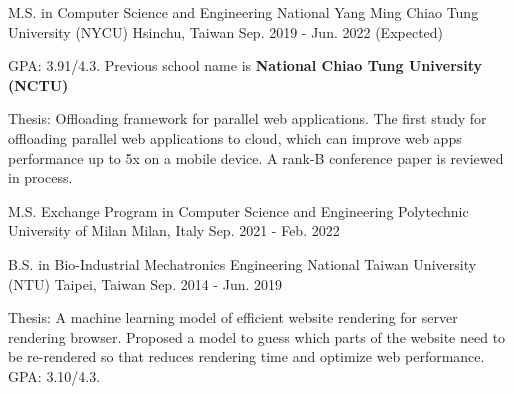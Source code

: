 
\vspace{-2mm}

\begin{cventries}

  
\cventry
  {M.S. in Computer Science and Engineering} %
  {National Yang Ming Chiao Tung University (NYCU)} %
  {Hsinchu, Taiwan} %
  {Sep. 2019 - Jun. 2022 (Expected)} %
  {
    \begin{cvitems} %
      \item {GPA: 3.91/4.3. Previous school name is \textbf{National Chiao Tung University (NCTU)}}
      \item {Thesis: Offloading framework for parallel web applications.
        The first study for offloading parallel web applications to cloud,
        which can improve web apps performance up to 5x on a mobile device.
        A rank-B conference paper is reviewed in process.
      }
    \end{cvitems}
  }

  \vspace{-3mm}

\cventry
    {M.S. Exchange Program in Computer Science and Engineering} %
    {Polytechnic University of Milan} %
    {Milan, Italy} %
    {Sep. 2021 - Feb. 2022} %
    {}

  \vspace{-6mm}

  \cventry
    {B.S. in Bio-Industrial Mechatronics Engineering} %
    {National Taiwan University (NTU)} %
    {Taipei, Taiwan} %
    {Sep. 2014 - Jun. 2019} %
    {
      \begin{cvitems} %
        \item {Thesis: A machine learning model of efficient website rendering for server rendering browser.
          Proposed a model to guess which parts of the website need to be re-rendered so that reduces rendering time
          and optimize web performance. GPA: 3.10/4.3. 
        }
      \end{cvitems}
    }

\end{cventries}
